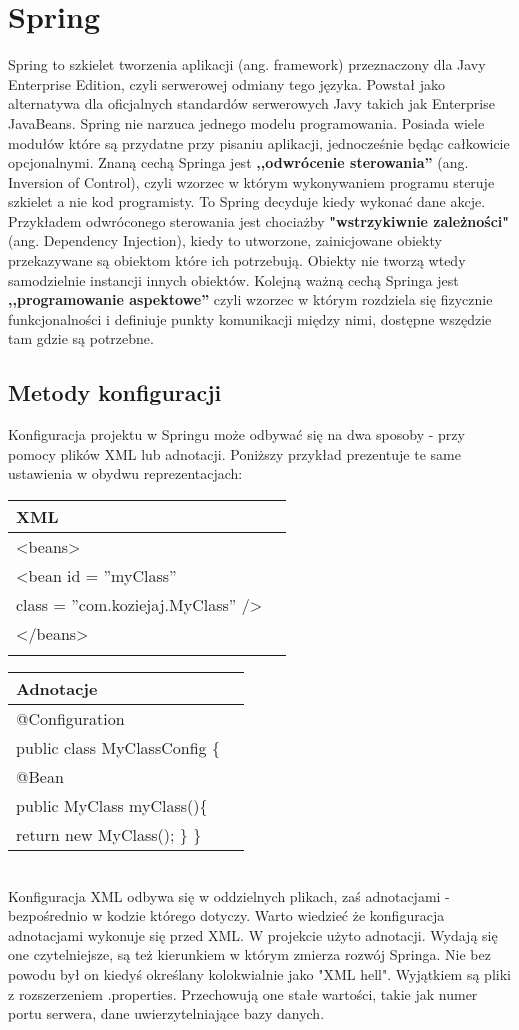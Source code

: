 \documentclass[a4paper,12pt,twoside,openany]{report}
\begin{document}
\chapter{Spring}
Spring to szkielet tworzenia aplikacji (ang. framework) przeznaczony dla Javy Enterprise Edition, czyli serwerowej odmiany tego języka. Powstał jako alternatywa dla oficjalnych standardów serwerowych Javy takich jak Enterprise JavaBeans. Spring nie narzuca jednego modelu programowania. Posiada wiele modułów które są przydatne przy pisaniu aplikacji, jednocześnie będąc całkowicie opcjonalnymi. Znaną cechą Springa jest \textbf{,,odwrócenie sterowania''} (ang. Inversion of Control), czyli wzorzec w którym wykonywaniem programu steruje szkielet a nie kod programisty. To Spring decyduje kiedy wykonać dane akcje. Przykładem odwróconego sterowania jest chociażby \textbf{"wstrzykiwnie zależności"} (ang. Dependency Injection), kiedy to utworzone, zainicjowane obiekty przekazywane są obiektom które ich potrzebują. Obiekty nie tworzą wtedy samodzielnie instancji innych obiektów. Kolejną ważną cechą Springa jest \textbf{,,programowanie aspektowe''} czyli wzorzec w którym rozdziela się fizycznie funkcjonalności i definiuje punkty komunikacji między nimi, dostępne wszędzie tam gdzie są potrzebne.
\section{Metody konfiguracji}
Konfiguracja projektu w Springu może odbywać się na dwa sposoby - przy pomocy plików XML lub adnotacji.  Poniższy przykład prezentuje te same ustawienia w obydwu reprezentacjach:\\
\begin{tabular}{|l|l|}
	\hline XML\\ 
	\hline <beans> \\
	<bean id = ''myClass'' \\ class = ''com.koziejaj.MyClass'' />\\
	</beans>\\ \\
	\hline 
\end{tabular} 
\begin{tabular}{|l|l|}
	\hline Adnotacje\\ 
	\hline @Configuration\\
	public class MyClassConfig \{\\
	@Bean \\
	public MyClass myClass()\{\\
	return new MyClass();
	\}
	\}\\
	\hline 
\end{tabular}\\
Konfiguracja XML odbywa się w oddzielnych plikach, zaś adnotacjami - bezpośrednio w kodzie którego dotyczy. Warto wiedzieć że konfiguracja adnotacjami wykonuje się przed XML. W projekcie użyto adnotacji. Wydają się one czytelniejsze, są też kierunkiem w którym zmierza rozwój Springa. Nie bez powodu był on kiedyś określany kolokwialnie jako "XML hell". Wyjątkiem są pliki z rozszerzeniem .properties. Przechowują one stałe wartości, takie jak numer portu serwera, dane uwierzytelniające bazy danych.
\end{document}
